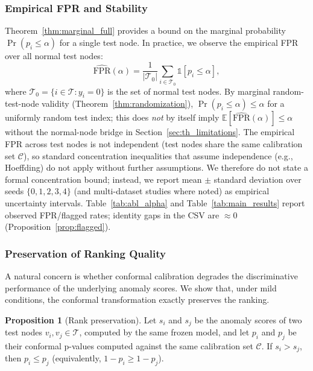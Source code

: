 \documentclass[a4paper]{cas-dc}
\theoremstyle{definition}
\newtheorem{proposition}{Proposition}
\begin{document}
\subsubsection{Empirical FPR and Stability}
\label{sec:th_finitesample}

Theorem~\ref{thm:marginal_full} provides a bound on the {marginal} probability $\Pr(p_i \leq \alpha)$ for a single test node.  In practice, we observe the {empirical} FPR over all normal test nodes:
\begin{equation}
\label{eq:empirical_fpr}
    \widehat{\text{FPR}}(\alpha) = \frac{1}{|\mathcal{T}_0|}\sum_{i \in \mathcal{T}_0}\mathbb{1}[p_i \leq \alpha],
\end{equation}
where $\mathcal{T}_0 = \{i \in \mathcal{T} : y_i = 0\}$ is the set of normal test nodes.  By marginal random-test-node validity (Theorem~\ref{thm:randomization}), $\Pr(p_i\leq\alpha)\leq\alpha$ for a uniformly random test index; this does \emph{not} by itself imply $\mathbb{E}[\widehat{\text{FPR}}(\alpha)]\leq\alpha$ without the normal-node bridge in Section~\ref{sec:th_limitations}. The empirical FPR across test nodes is not independent (test nodes share the same calibration set $\mathcal{C}$), so standard concentration inequalities that assume independence (e.g., Hoeffding) do not apply without further assumptions. We therefore do not state a formal concentration bound; instead, we report mean $\pm$ standard deviation over seeds $\{0,1,2,3,4\}$ (and multi-dataset studies where noted) as empirical uncertainty intervals. Table~\ref{tab:abl_alpha} and Table~\ref{tab:main_results} report observed FPR/flagged rates; identity gaps in the CSV are $\approx 0$ (Proposition~\ref{prop:flagged}).

\subsubsection{Preservation of Ranking Quality}
\label{sec:th_ranking}

A natural concern is whether conformal calibration degrades the discriminative performance of the underlying anomaly scores.  We show that, under mild conditions, the conformal transformation exactly preserves the ranking.

\begin{proposition}[Rank preservation]
\label{prop:rank}
Let $s_i$ and $s_j$ be the anomaly scores of two test nodes $v_i, v_j \in \mathcal{T}$, computed by the same frozen model, and let $p_i$ and $p_j$ be their conformal p-values computed against the same calibration set $\mathcal{C}$.  If $s_i > s_j$, then $p_i \leq p_j$ (equivalently, $1 - p_i \geq 1 - p_j$).
\end{proposition}
\end{document}
